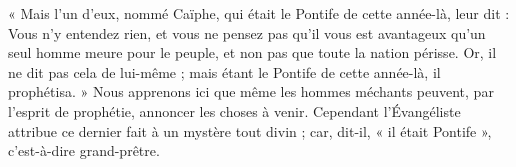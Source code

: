  « Mais l’un d’eux, nommé Caïphe, qui était le Pontife de cette année-là, leur dit : Vous n’y entendez rien, et vous ne pensez pas qu’il vous est avantageux qu’un seul homme meure pour le peuple, et non pas que toute la nation périsse. Or, il ne dit pas cela de lui-même ; mais étant le Pontife de cette année-là, il prophétisa. » Nous apprenons ici que même les hommes méchants peuvent, par l’esprit de prophétie, annoncer les choses à venir. Cependant l’Évangéliste attribue ce dernier fait à un mystère tout divin ; car, dit-il, « il était Pontife », c’est-à-dire grand-prêtre.